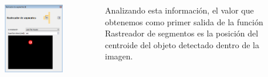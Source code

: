 \begin{frame}
	\begin{columns}
		\begin{figure}
			\begin{center}
				\includegraphics[width=0.9\textwidth]{images/01-vision-artificial/13.png}
			\end{center}
		\end{figure}

		Analizando esta información, el valor que obtenemos como primer salida de la función Rastreador de segmentos es la posición del centroide del objeto detectado dentro de la imagen.
	\end{columns}
\end{frame}


